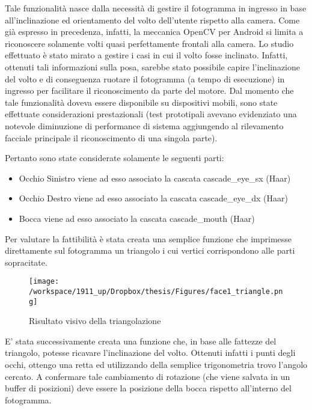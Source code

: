 Tale funzionalità nasce dalla necessità di gestire il fotogramma in ingresso in base all'inclinazione ed orientamento del volto dell'utente rispetto alla camera. Come già espresso in precedenza, infatti, la meccanica OpenCV per Android si limita a riconoscere solamente volti quasi perfettamente frontali alla camera. Lo studio effettuato è stato mirato a gestire i casi in cui il volto fosse inclinato. Infatti, ottenuti tali informazioni sulla posa, sarebbe stato possibile capire l'inclinazione del volto e di conseguenza ruotare il fotogramma (a tempo di esecuzione) in ingresso per facilitare il riconoscimento da parte del motore. Dal momento che tale funzionalità doveva essere disponibile su dispositivi mobili, sono state effettuate considerazioni prestazionali (test prototipali avevano evidenziato una notevole diminuzione di performance di sistema aggiungendo al rilevamento facciale principale il riconoscimento di una singola parte). 

Pertanto sono state considerate solamente le seguenti parti:

\begin{itemize}
\item Occhio Sinistro viene ad esso associato la cascata cascade\_eye\_sx (Haar)
\item Occhio Destro viene ad esso associato la cascata cascade\_eye\_dx (Haar)
\item Bocca viene ad esso associato la cascata cascade\_mouth (Haar)
\end{itemize}

Per valutare la fattibilità è stata creata una semplice funzione che imprimesse direttamente sul fotogramma un triangolo i cui vertici corrispondono alle parti sopracitate.

\begin{figure}[H]\centering  
\texttt{[image: /workspace/1911\_up/Dropbox/thesis/Figures/face1\_triangle.png]}
\caption[Risultato visivo della triangolazione]{Risultato visivo della triangolazione}
\label{pic-a}
\end{figure}

E' stata successivamente creata una funzione che, in base alle fattezze del triangolo, potesse ricavare l'inclinazione del volto. Ottenuti infatti i punti degli occhi, ottengo una retta ed utilizzando della semplice trigonometria trovo l'angolo cercato. A confermare tale cambiamento di rotazione (che viene salvata in un buffer di posizioni) deve essere la posizione della bocca rispetto all'interno del fotogramma.

